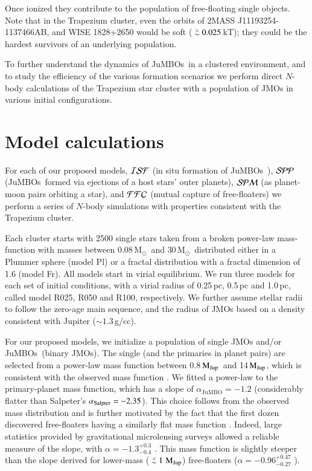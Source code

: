 \documentclass[submission,phys]{lib/SciPost}
\newcommand{\MSun}{\mbox{$\mathrm{{M}}_\odot$}}
\newcommand{\MJup}{\mbox{$\mathrm{{M}}_{\rm Jup}$}}
\def\apgt{\ {\raise-.5ex\hbox{$\buildrel>\over\sim$}}\ }
\def\aplt{\ {\raise-.5ex\hbox{$\buildrel<\over\sim$}}\ }
\newcommand{\jumbo}{\mbox{JuMBO}}
\newcommand{\jumbos}{\mbox{JuMBOs}}
\begin{document}
Once ionized they contribute to the population of free-floating single
objects.  Note that in the Trapezium cluster, even the orbits of 2MASS
J11193254-1137466AB, and WISE 1828+2650 would be soft ($\apgt
0.025$\,kT); they could be the hardest survivors of an underlying
population.

To further understand the dynamics of \jumbos\, in a clustered
environment, and to study the efficiency of the various formation
scenarios we perform direct $N$-body calculations of the Trapezium
star cluster with a population of JMOs in various
initial configurations.

\section{Model calculations}\label{Sect:Model}

For each of our proposed models, ${\cal ISF}$ (in situ formation of
\jumbos\ ), ${\cal SPP}$ (\jumbos\, formed via ejections of a host stars'
outer planets), ${\cal SPM}$ (as planet-moon pairs orbiting a star),
and ${\cal FFC}$ (mutual capture of free-floaters) we perform a
series of $N$-body simulations with properties consistent with the
Trapezium cluster.

Each cluster starts with 2500 single stars taken from a broken
power-law mass-function \cite{2002Sci...295...82K} with masses between
$0.08$\,\MSun\, and $30$\,\MSun\, distributed either in a Plummer
sphere (model Pl) or a fractal distribution with a fractal dimension
of 1.6 (model Fr). All models start in virial equilibrium.  We run
three models for each set of initial conditions, with a virial radius
of 0.25\,pc, 0.5\,pc and 1.0\,pc, called model R025, R050 and R100,
respectively.  We further assume stellar radii to follow the zero-age
main sequence, and the radius of JMOs based on a density consistent
with Jupiter ($\sim 1.3$\,g/cc).

For our proposed models, we initialize a population of single
JMOs and/or \jumbos\, (binary JMOs). The single (and the primaries in
planet pairs) are selected from a power-law mass function between
0.8\,\MJup\, and 14\,\MJup, which is consistent with the observed mass
function \cite{2023arXiv231001231P}. We fitted a power-law to the
primary-planet mass function, which has a slope of $\alpha_{\jumbo}
=-1.2$ (considerably flatter than Salpeter's $\alpha_{\rm Salpter} =
-2.35$). This choice follows from the observed mass distribution and is 
further motivated by the fact that the first dozen discovered free-floaters 
having a similarly flat mass function \cite{2000MNRAS.314..858L}. Indeed, large 
statistics provided by gravitational microlensing surveys allowed a reliable
measure of the slope, with $\alpha = -1.3^{+0.3}_{-0.4}$
\cite{2011Natur.473..349S}. This mass function is slightly steeper
than the slope derived for lower-mass ($\aplt 1$\,\MJup) free-floaters
($\alpha = -0.96^{+0.47}_{-0.27}$ \cite{2023AJ....166..108S}).
\end{document}

